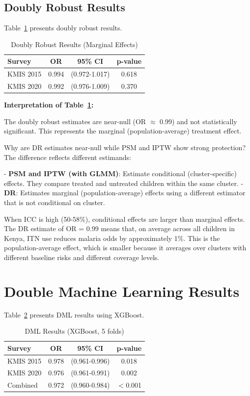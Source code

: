 \subsection{Doubly Robust Results}

Table~\ref{tab:dr_ch4} presents doubly robust results.

\begin{table}[htbp]
	\centering
	\caption{Doubly Robust Results (Marginal Effects)}
	\label{tab:dr_ch4}
	\begin{tabular}{@{}lccc@{}}
		\toprule
		\textbf{Survey} & \textbf{OR} & \textbf{95\% CI} & \textbf{p-value} \\
		\midrule
		KMIS 2015 & 0.994 & (0.972-1.017) & 0.618 \\
		KMIS 2020 & 0.992 & (0.976-1.009) & 0.370 \\
		\bottomrule
	\end{tabular}
\end{table}

\textbf{Interpretation of Table~\ref{tab:dr_ch4}:}

The doubly robust estimates are near-null (OR $\approx$ 0.99) and not statistically significant. This represents the marginal (population-average) treatment effect.

Why are DR estimates near-null while PSM and IPTW show strong protection? The difference reflects different estimands:

- \textbf{PSM and IPTW (with GLMM)}: Estimate conditional (cluster-specific) effects. They compare treated and untreated children within the same cluster.
- \textbf{DR}: Estimates marginal (population-average) effects using a different estimator that is not conditional on cluster.

When ICC is high (50-58\%), conditional effects are larger than marginal effects. The DR estimate of OR = 0.99 means that, on average across all children in Kenya, ITN use reduces malaria odds by approximately 1\%. This is the population-average effect, which is smaller because it averages over clusters with different baseline risks and different coverage levels.

\section{Double Machine Learning Results}

Table~\ref{tab:dml_ch4} presents DML results using XGBoost.

\begin{table}[htbp]
	\centering
	\caption{DML Results (XGBoost, 5 folds)}
	\label{tab:dml_ch4}
	\begin{tabular}{@{}lccc@{}}
		\toprule
		\textbf{Survey} & \textbf{OR} & \textbf{95\% CI} & \textbf{p-value} \\
		\midrule
		KMIS 2015 & 0.978 & (0.961-0.996) & 0.018 \\
		KMIS 2020 & 0.976 & (0.961-0.991) & 0.002 \\
		Combined & 0.972 & (0.960-0.984) & $<$0.001 \\
		\bottomrule
	\end{tabular}
\end{table}

